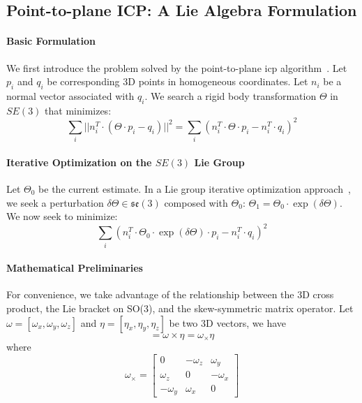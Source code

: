 \subsection{Point-to-plane ICP: A Lie Algebra Formulation}
\label{in:sec:p2plane}

\paragraph{Basic Formulation}
We first introduce the problem solved by the point-to-plane \gls{icp} algorithm~\cite{Rusinkiewicz:IC3DIM:2001}.
Let $p_i$ and $q_i$ be corresponding 3D points in homogeneous coordinates. Let $n_i$ be a normal vector associated with $q_i$. We search a rigid body transformation $\Theta$ in $SE(3)$ that minimizes:
\begin{equation}
\sum_i ||n_i^T \cdot (\Theta \cdot p_i - q_i)||^2 = \sum_i (n_i^T \cdot \Theta \cdot p_i - n_i^T \cdot q_i)^2
\end{equation}

\paragraph{Iterative Optimization on the $SE(3)$ Lie Group}
Let $\Theta_0$ be the current estimate. In a Lie group iterative optimization approach~\cite{Mahony:JGO:2002,Vercauteren:IPMI:2007}, we seek a perturbation $\delta\Theta \in \mathfrak{se}(3)$ composed with
$\Theta_0$: $\Theta_1 = \Theta_0 \cdot \exp(\delta\Theta)$. We now seek to minimize:
\begin{equation}
\sum_i (n_i^T \cdot \Theta_0 \cdot \exp(\delta\Theta) \cdot p_i - n_i^T \cdot q_i)^2
\end{equation}

\paragraph{Mathematical Preliminaries}
For convenience, we take advantage of the relationship between the 3D cross product, the Lie bracket on SO(3), and the skew-symmetric matrix operator.
Let $\omega = [\omega_x, \omega_y, \omega_z]$ and $\eta = [\eta_x, \eta_y, \eta_z]$ be two 3D vectors, we have
\begin{equation}
[\omega, \eta] = \omega \times \eta = \omega_\times \eta
\end{equation}
where
\begin{equation}
\omega_\times =
\begin{bmatrix}
0         & -\omega_z & \omega_y \\
\omega_z  & 0         & -\omega_x \\
-\omega_y & \omega_x  & 0
\end{bmatrix}
\end{equation}

